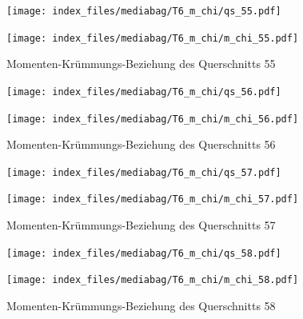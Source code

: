 \documentclass[
  11pt,
  letterpaper,
]{scrreprt}
\begin{document}
\begin{figure}[H]

\begin{minipage}{0.50\linewidth}
\texttt{[image: index\_files/mediabag/T6\_m\_chi/qs\_55.pdf]}\end{minipage}%
%
\begin{minipage}{0.50\linewidth}
\texttt{[image: index\_files/mediabag/T6\_m\_chi/m\_chi\_55.pdf]}\end{minipage}%

\caption{\label{fig-mchi_anhang}Momenten-Krümmungs-Beziehung des
Querschnitts 55}

\end{figure}%

\begin{figure}[H]

\begin{minipage}{0.50\linewidth}
\texttt{[image: index\_files/mediabag/T6\_m\_chi/qs\_56.pdf]}\end{minipage}%
%
\begin{minipage}{0.50\linewidth}
\texttt{[image: index\_files/mediabag/T6\_m\_chi/m\_chi\_56.pdf]}\end{minipage}%

\caption{\label{fig-mchi_anhang}Momenten-Krümmungs-Beziehung des
Querschnitts 56}

\end{figure}%

\begin{figure}[H]

\begin{minipage}{0.50\linewidth}
\texttt{[image: index\_files/mediabag/T6\_m\_chi/qs\_57.pdf]}\end{minipage}%
%
\begin{minipage}{0.50\linewidth}
\texttt{[image: index\_files/mediabag/T6\_m\_chi/m\_chi\_57.pdf]}\end{minipage}%

\caption{\label{fig-mchi_anhang}Momenten-Krümmungs-Beziehung des
Querschnitts 57}

\end{figure}%

\begin{figure}[H]

\begin{minipage}{0.50\linewidth}
\texttt{[image: index\_files/mediabag/T6\_m\_chi/qs\_58.pdf]}\end{minipage}%
%
\begin{minipage}{0.50\linewidth}
\texttt{[image: index\_files/mediabag/T6\_m\_chi/m\_chi\_58.pdf]}\end{minipage}%

\caption{\label{fig-mchi_anhang}Momenten-Krümmungs-Beziehung des
Querschnitts 58}

\end{figure}%
\end{document}
